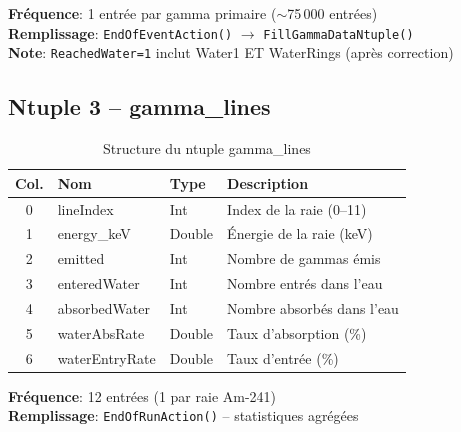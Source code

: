 \documentclass[11pt,a4paper]{article}
\begin{document}
\textbf{Fréquence}: 1 entrée par gamma primaire ($\sim$75\,000 entrées)\\
\textbf{Remplissage}: \texttt{EndOfEventAction()} $\rightarrow$ \texttt{FillGammaDataNtuple()}\\
\textbf{Note}: \texttt{ReachedWater=1} inclut Water1 ET WaterRings (après correction)

\subsection{Ntuple 3 -- gamma\_lines}

\begin{table}[h]
\centering
\begin{tabular}{clll}
\toprule
\rowcolor{headerblue!20}
\textbf{Col.} & \textbf{Nom} & \textbf{Type} & \textbf{Description} \\
\midrule
0 & lineIndex & Int & Index de la raie (0--11) \\
\rowcolor{lightgray}
1 & energy\_keV & Double & Énergie de la raie (keV) \\
2 & emitted & Int & Nombre de gammas émis \\
\rowcolor{lightgray}
3 & enteredWater & Int & Nombre entrés dans l'eau \\
4 & absorbedWater & Int & Nombre absorbés dans l'eau \\
\rowcolor{lightgray}
5 & waterAbsRate & Double & Taux d'absorption (\%) \\
6 & waterEntryRate & Double & Taux d'entrée (\%) \\
\bottomrule
\end{tabular}
\caption{Structure du ntuple gamma\_lines}
\end{table}

\textbf{Fréquence}: 12 entrées (1 par raie Am-241)\\
\textbf{Remplissage}: \texttt{EndOfRunAction()} -- statistiques agrégées
\end{document}
